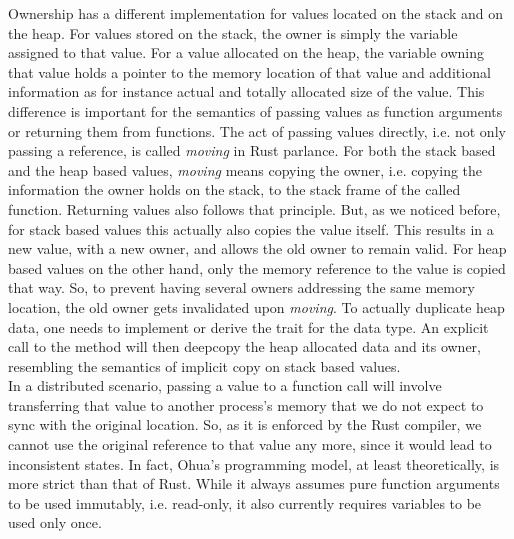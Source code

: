 Ownership has a different implementation for values located on the stack and on the heap. For values stored on the stack, the owner is simply the variable assigned to that value. For a value allocated on the heap, the variable owning that value holds a pointer to the memory location of that value and additional information as for instance actual and totally allocated size of the value. This difference is important for the semantics of passing values as function arguments or returning them from functions. The act of passing values directly, i.e. not only passing a reference, is called \emph{moving} in Rust parlance. For both the stack based and the heap based values, \emph{moving} means copying the owner, i.e. copying the information the owner holds on the stack, to the stack frame of the called function. Returning values also follows that principle. But, as we noticed before, for stack based values this actually also copies the value itself. This results in a new value, with a new owner, and allows the old owner to remain valid. For heap based values on the other hand, only the memory reference to the value is copied that way. So, to prevent having several owners addressing the same memory location, the old owner gets invalidated upon \emph{moving}. To actually duplicate heap data, one needs to implement or derive the  trait for the data type. An explicit call to the  method will then deepcopy the heap allocated data and its owner, resembling the semantics of implicit copy on stack based values.\\

In a distributed scenario, passing a value to a function call will involve transferring that value to another process's memory that we do not expect to sync with the original location. So, as it is enforced by the Rust compiler, we cannot use the original reference to that value any more, since it would lead to inconsistent states. In fact, Ohua's programming model, at least theoretically, is more strict than that of Rust. While it always assumes pure function arguments to be used immutably, i.e. read-only, it also currently requires variables to be used only once. \\

